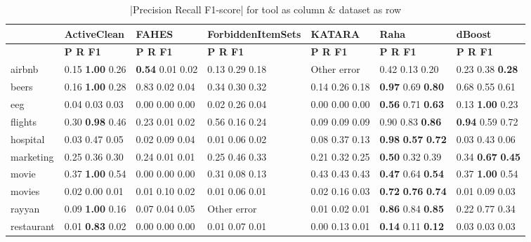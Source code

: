 \begin{table}[H]
\centering
\caption{|Precision Recall F1-score| for tool as column \& dataset as row}
\label{tab:empirical_results}
\begin{adjustbox}{center}
\begin{tabular}{lllllll}
\toprule
{} & ActiveClean & FAHES & ForbiddenItemSets & KATARA & Raha & dBoost \\
\midrule
 & \textbf{\space\space\space P \space\space\space\space R \space\space\space F1} & \textbf{\space\space\space P \space\space\space\space R \space\space\space F1} & \textbf{\space\space\space P \space\space\space\space R \space\space\space F1} & \textbf{\space\space\space P \space\space\space\space R \space\space\space F1} & \textbf{\space\space\space P \space\space\space\space R \space\space\space F1} & \textbf{\space\space\space P \space\space\space\space R \space\space\space F1} \\
airbnb & 0.15 \textbf{1.00} 0.26 & \textbf{0.54} 0.01 0.02 & 0.13 0.29 0.18 & Other error & 0.42 0.13 0.20 & 0.23 0.38 \textbf{0.28} \\
beers & 0.16 \textbf{1.00} 0.28 & 0.83 0.02 0.04 & 0.34 0.30 0.32 & 0.14 0.26 0.18 & \textbf{0.97} 0.69 \textbf{0.80} & 0.68 0.55 0.61 \\
eeg & 0.04 0.03 0.03 & 0.00 0.00 0.00 & 0.02 0.26 0.04 & 0.00 0.00 0.00 & \textbf{0.56} 0.71 \textbf{0.63} & 0.13 \textbf{1.00} 0.23 \\
flights & 0.30 \textbf{0.98} 0.46 & 0.23 0.01 0.02 & 0.56 0.16 0.24 & 0.09 0.09 0.09 & 0.90 0.83 \textbf{0.86} & \textbf{0.94} 0.59 0.72 \\
hospital & 0.03 0.47 0.05 & 0.02 0.09 0.04 & 0.01 0.06 0.02 & 0.08 0.37 0.13 & \textbf{0.98} \textbf{0.57} \textbf{0.72} & 0.03 0.43 0.06 \\
marketing & 0.25 0.36 0.30 & 0.24 0.01 0.01 & 0.25 0.46 0.33 & 0.21 0.32 0.25 & \textbf{0.50} 0.32 0.39 & 0.34 \textbf{0.67} \textbf{0.45} \\
movie & 0.37 \textbf{1.00} 0.54 & 0.00 0.00 0.00 & 0.31 0.08 0.13 & 0.43 0.43 0.43 & \textbf{0.47} 0.64 \textbf{0.54} & 0.37 \textbf{1.00} 0.54 \\
movies & 0.02 0.00 0.01 & 0.01 0.10 0.02 & 0.01 0.06 0.01 & 0.02 0.16 0.03 & \textbf{0.72} \textbf{0.76} \textbf{0.74} & 0.01 0.09 0.03 \\
rayyan & 0.09 \textbf{1.00} 0.16 & 0.07 0.04 0.05 & Other error & 0.01 0.02 0.01 & \textbf{0.86} 0.84 \textbf{0.85} & 0.22 0.77 0.34 \\
restaurant & 0.01 \textbf{0.83} 0.02 & 0.00 0.00 0.00 & 0.01 0.07 0.01 & 0.00 0.13 0.01 & \textbf{0.14} 0.11 \textbf{0.12} & 0.03 0.03 0.03 \\

\end{tabular}
\end{adjustbox}
\end{table}

